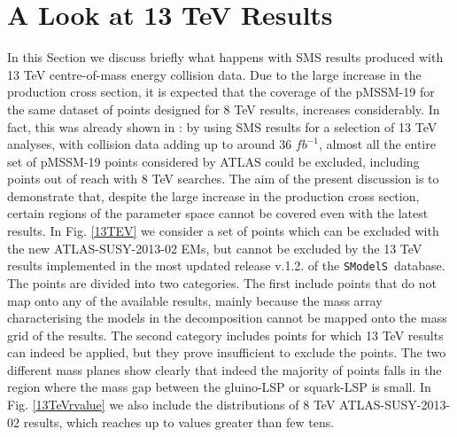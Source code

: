 \documentclass[preprint,number,sort&compress,twocolumn,3p]{elsstyarticle}
\newcommand{\SMO}{\texttt{SModelS\xspace}}
\begin{document}
\section{A Look at 13 TeV Results}
In this Section we discuss briefly what happens with SMS results produced with 13 TeV centre-of-mass energy collision data. Due to the large increase in the production cross section, it is expected that the coverage of the pMSSM-19 for the same dataset of points designed for 8 TeV results, increases considerably. In fact, this was already shown in \cite{Dutta:2018ioj}: by using SMS results for a selection of 13 TeV analyses, with collision data adding up to around 36 $fb^{-1}$, almost all the entire set of pMSSM-19 points considered by ATLAS could be excluded, including points out of reach with 8 TeV searches. The aim of the present discussion is to demonstrate that, despite the large increase in the production cross section, certain regions of the parameter space cannot be covered even with the latest results. In Fig. \ref{13TEV} we consider a set of points which can be excluded with the new ATLAS-SUSY-2013-02 EMs, but cannot be excluded by the 13 TeV results implemented in the most updated release v.1.2. of the \SMO~database. The points are divided into two categories. The first include points that do not map onto any of the available results, mainly because the mass array characterising the models in the decomposition cannot be mapped onto the mass grid of the results. The second category includes points for which 13 TeV results can indeed be applied, but they prove insufficient to exclude the points. The two different mass planes show clearly that indeed the majority of points falls in the region where the mass gap between the gluino-LSP or squark-LSP is small. In Fig. \ref{13TeVrvalue} we also include the distributions of 8 TeV ATLAS-SUSY-2013-02 results, which reaches up to values greater than few tens.
\end{document}
